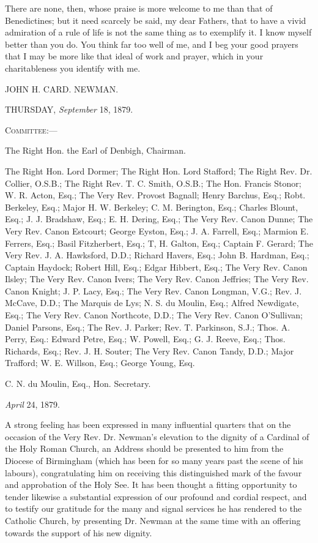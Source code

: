 There are none, then, whose praise is more welcome to me than that
of Benedictines; but it need scarcely be said, my dear Fathers, that
to have a vivid admiration of a rule of life is not the same thing as
to exemplify it. I know myself better than you do. You think far too
well of me, and I beg your good prayers that I may be more like that
ideal of work and prayer, which in your charitableness you identify
with me.

JOHN H. CARD. NEWMAN.


THURSDAY, \emph{September} 18, 1879.

C\textsc{ommittee}:—

The Right Hon. the Earl of Denbigh, Chairman.

The Right Hon. Lord Dormer; The Right Hon. Lord Stafford; The Right
Rev. Dr. Collier, O.S.B.; The Right Rev. T. C. Smith, O.S.B.; The Hon.
Francis Stonor; W. R. Acton, Esq.; The Very Rev. Provost Bagnall;
Henry Barchus, Esq.; Robt. Berkeley, Esq.; Major H. W. Berkeley; C. M.
Berington, Esq.; Charles Blount, Esq.; J. J. Bradshaw, Esq.; E. H.
Dering, Esq.; The Very Rev. Canon Dunne; The Very Rev. Canon Estcourt;
George Eyston, Esq.; J. A. Farrell, Esq.; Marmion E. Ferrers, Esq.;
Basil Fitzherbert, Esq.; T, H. Galton, Esq.; Captain F. Gerard; The
Very Rev. J. A. Hawksford, D.D.; Richard Havers, Esq.; John B.
Hardman, Esq.; Captain Haydock; Robert Hill, Esq.; Edgar Hibbert,
Esq.; The Very Rev. Canon Ilsley; The Very Rev. Canon Ivers; The Very
Rev. Canon Jeffries; The Very Rev. Canon Knight; J. P. Lacy, Esq.; The
Very Rev. Canon Longman, V.G.; Rev. J. McCave, D.D.; The Marquis de
Lys; N. S. du Moulin, Esq.; Alfred Newdigate, Esq.; The Very Rev.
Canon Northcote, D.D.; The Very Rev. Canon O'Sullivan; Daniel Parsons,
Esq.; The Rev. J. Parker; Rev. T. Parkinson, S.J.; Thos. A. Perry,
Esq.: Edward Petre, Esq.; W. Powell, Esq.; G. J. Reeve, Esq.; Thos.
Richards, Esq.; Rev. J. H. Souter; The Very Rev. Canon Tandy, D.D.;
Major Trafford; W. E. Willson, Esq.; George Young, Esq.

C. N. du Moulin, Esq., Hon. Secretary.


\emph{April} 24, 1879.

A strong feeling has been expressed in many influential quarters that
on the occasion of the Very Rev. Dr. Newman's elevation to the dignity
of a Cardinal of the Holy Roman Church, an Address should be presented
to him from the Diocese of Birmingham (which has been for so many
years past the scene of his labours), congratulating him on receiving
this distinguished mark of the favour and approbation of the Holy See.
It has been thought a fitting opportunity to tender likewise a
substantial expression of our profound and cordial respect, and to
testify our gratitude for the many and signal services he has rendered
to the Catholic Church, by presenting Dr. Newman at the same time with
an offering towards the support of his new dignity.

